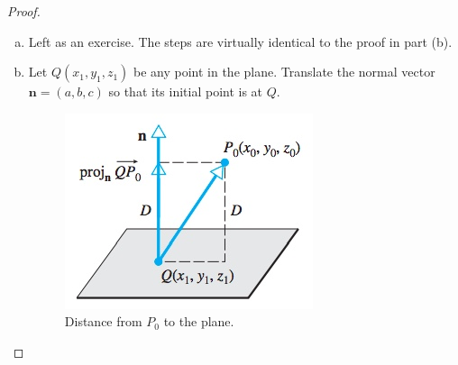 \documentclass[12pt,letterpaper,reqno]{article}
\numberwithin{equation}{section}
\begin{document}
\begin{proof} \hspace{15cm}
	\begin{enumerate}[(a)]
		\item Left as an exercise. The steps are virtually identical to the proof in part (b).		
		\item Let $Q(x_1,y_1,z_1)$ be any point in the plane. Translate the normal vector $\mathbf{n}=(a,b,c)$ so that its initial point is at $Q$. 
	\begin{figure}[h]
		\begin{center}
			\includegraphics[scale=0.5]{figures_mvc/dist_to_plane_book}
		\end{center}
		\caption{Distance from $P_0$ to the plane.}
	\end{figure} 
		

\end{enumerate}
\end{proof}
\end{document}
